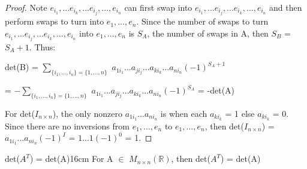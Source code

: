 \begin{proof}
        Note $e_{i_1},...e_{i_k},...e_{i_j},...,e_{i_n}$
        can first swap into $e_{i_1},...e_{i_j},...e_{i_k},...,e_{i_n}$
        and then perform swaps to turn into $e_1,...,e_n$.
        Since the number of swaps to turn
        $e_{i_1},...e_{i_j},...e_{i_k},...,e_{i_n}$ into $e_1,...,e_n$
        is $S_A$, the number of swaps in A, then $S_B$ = $S_A + 1$. Thus:

        \hspace{0.5cm}
        det(B)
        = $\sum_{\{i_1,...,i_n\} = \{1,...,n\}}$
            $a_{1i_1}...a_{ji_j}...a_{ki_k}...a_{ni_n}(-1)^{S_A+1}$

        \hspace{1.85cm}
        = $-\sum_{\{i_1,...,i_n\} = \{1,...,n\}}$
            $a_{1i_1}...a_{ji_j}...a_{ki_k}...a_{ni_n}(-1)^{S_A}$
        = -det(A)

        \vspace{0.3cm}

        For det($I_{n \times n}$),
        the only nonzero $a_{1i_1}...a_{ni_n}$
        is when each $a_{ki_k}$ = 1 else $a_{ki_k}$ = 0.
        Since there are no inversions from $e_1,...,e_n$ to $e_1,...,e_n$,
        then det($I_{n \times n}$) = $a_{1i_1}...a_{ni_n}(-1)^I$
        = $1...1(-1)^0$ = 1.
    \end{proof}

    \vspace{0.5cm}



    \begin{wtheorem}{det($A^T$) = det(A)}{16cm}
        For A $\in$ $M_{n \times n}(\mathbb{R})$, then
        det($A^T$) = det(A)
    \end{wtheorem}

